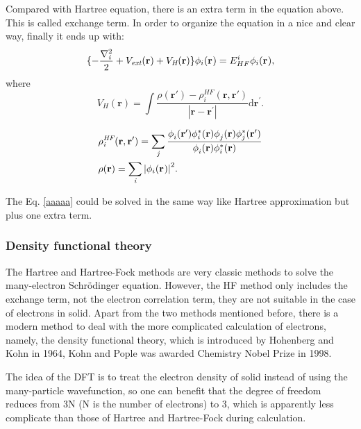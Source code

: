 \documentclass[a4paper, 12pt, titlepage,oneside,drop]{kthesis}
\begin{document}
Compared with Hartree equation, there is an extra term in the equation above. This is called exchange term. In order to organize the equation in a nice and clear way, finally it ends up with:
\begin{equation}\label{aaaaa}\begin{split}
\{ -\frac{\nabla^{2}_{\textit i}}{2} + V_\textit{ext}(\textbf{r}) +V_\textit{H}(\textbf{r}) \}  \bwf<i><>  = E^{i}_{HF}   \bwf<i><>, 
\end{split}\end{equation}
where
\begin{equation}
 V_\textit{H}(\textbf{r})= \int \frac{\rho(\textbf{r}{'}) - \rho_{\textit{i}}^{\textit{HF}}(\textbf{r},\textbf{r}{'})}{|\textbf{r} - \textbf{r}^{'} |}  \mathrm{d}\textbf{r}^{'}.
\end{equation}

\begin{equation}
\begin{split}
& \rho_{\textit{i}}^{\textit{HF}}(\textbf{r},\textbf{r}{'}) = \sumi<j> \frac{\phi_{i}^{}(\textbf{r}{'}) \phi_{i}^{*}(\textbf{r}{}) \phi_{j}^{}(\textbf{r}{}) \phi_{j}^{*}(\textbf{r}{'})} {\phi_{i}^{}(\textbf{r}) \phi_{i}^{*}(\textbf{r})}  \\
& \rho(\textbf{r}) = \sumi<i>  {|\bwf<i><>|}^{2}.
\end{split}
\end{equation}

The Eq. \ref{aaaaa} could be solved in the same way like Hartree approximation but plus one extra term.

\subsubsection{Density functional theory}
The Hartree and Hartree-Fock methods are very classic methods to solve the many-electron 
 Schrödinger equation. However, the HF method only includes the exchange term, not the electron correlation term, they are not suitable in the case of electrons in solid.
 Apart from the two methods mentioned before, there is a modern method to deal with
 the more complicated calculation of electrons, namely, the density functional theory, which is introduced by Hohenberg and
 Kohn in 1964, Kohn and Pople was awarded Chemistry Nobel Prize in 1998.

The idea of the DFT is to treat the electron density of solid instead of using the many-particle wavefunction, so one can
 benefit that the degree of freedom reduces from 3N (N is the number of electrons) to 3, which is apparently less complicate than 
those of Hartree and Hartree-Fock during calculation. 
\end{document}
